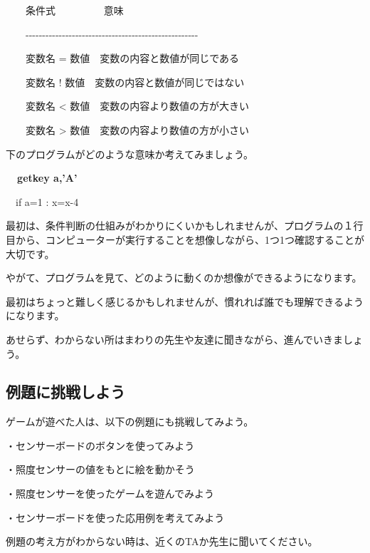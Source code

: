 \documentclass[a4paper,12pt]{jarticle}
\begin{document}
\bigskip

\ \ \ \ 条件式 \ \ \ \ \ \ \ \ \ 意味

\ \ \ \ {}-{}-{}-{}-{}-{}-{}-{}-{}-{}-{}-{}-{}-{}-{}-{}-{}-{}-{}-{}-{}-{}-{}-{}-{}-{}-{}-{}-{}-{}-{}-{}-{}-{}-{}-{}-{}-{}-{}-{}-{}-{}-{}-{}-{}-{}-{}-{}-{}-{}-{}-{}-

\ \ \ \ 変数名 =
数値\ \ 変数の内容と数値が同じである

\ \ \ \ 変数名 !
数値\ \ 変数の内容と数値が同じではない

\ \ \ \ 変数名 {\textless}
数値\ \ 変数の内容より数値の方が大きい

\ \ \ \ 変数名 {\textgreater}
数値\ \ 変数の内容より数値の方が小さい


\bigskip

下のプログラムがどのような意味か考えてみましょう。


\bigskip

{\bfseries
\ \ getkey a,’A’

\ \ if a=1 : x=x-4}


\bigskip

最初は、条件判断の仕組みがわかりにくいかもしれませんが、プログラムの１行目から、コンピューターが実行することを想像しながら、1つ1つ確認することが大切です。

やがて、プログラムを見て、どのように動くのか想像ができるようになります。

最初はちょっと難しく感じるかもしれませんが、慣れれば誰でも理解できるようになります。

あせらず、わからない所はまわりの先生や友達に聞きながら、進んでいきましょう。

\bigskip

\subsection{例題に挑戦しよう}

\bigskip
\bigskip

ゲームが遊べた人は、以下の例題にも挑戦してみよう。

\bigskip

・センサーボードのボタンを使ってみよう

・照度センサーの値をもとに絵を動かそう

・照度センサーを使ったゲームを遊んでみよう

・センサーボードを使った応用例を考えてみよう


\bigskip

例題の考え方がわからない時は、近くのTAか先生に聞いてください。
\end{document}

